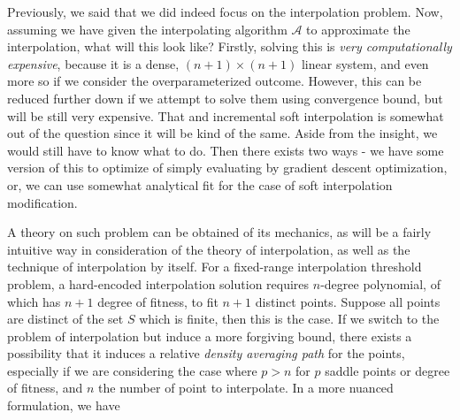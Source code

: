 \documentclass[
  journal=largetwo,
  year=2025,
  volume=37,
]{cup-journal}
\begin{document}
Previously, we said that we did indeed focus on the interpolation problem. Now, assuming we have given the interpolating algorithm $\mathcal{A}$ to approximate the interpolation, what will this look like? Firstly, solving this is \textit{very computationally expensive}, because it is a dense, $(n+1)\times(n+1)$ linear system, and even more so if we consider the overparameterized outcome. However, this can be reduced further down if we attempt to solve them using convergence bound, but will be still very expensive. That and incremental soft interpolation is somewhat out of the question since it will be kind of the same. Aside from the insight, we would still have to know what to do. Then there exists two ways - we have some version of this to optimize of simply evaluating by gradient descent optimization, or, we can use somewhat analytical fit for the case of soft interpolation modification. 

A theory on such problem can be obtained of its mechanics, as will be a fairly intuitive way in consideration of the theory of interpolation, as well as the technique of interpolation by itself. For a fixed-range interpolation threshold problem, a hard-encoded interpolation solution requires $n$-degree polynomial, of which has $n+1$ degree of fitness, to fit $n+1$ distinct points. Suppose all points are distinct of the set $S$ which is finite, then this is the case. If we switch to the problem of interpolation but induce a more forgiving bound, there exists a possibility that it induces a relative \textit{density averaging path} for the points, especially if we are considering the case where $p>n$ for $p$ saddle points or degree of fitness, and $n$ the number of point to interpolate. In a more nuanced formulation, we have
\end{document}
